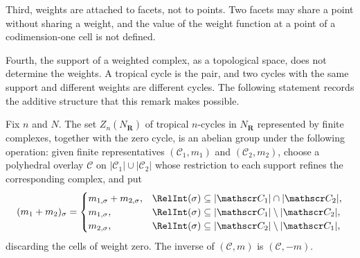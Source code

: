 Third, weights are attached to facets, not to points.  Two facets may share a
point without sharing a weight, and the value of the weight function at a
point of a codimension-one cell is not defined.

Fourth, the support of a weighted complex, as a topological space, does not
determine the weights.  A tropical cycle is the pair, and two cycles with the
same support and different weights are different cycles.  The following
statement records the additive structure that this remark makes possible.

\begin{proposition}
\label{prop:ch10-cycle-group}
Fix $n$ and $N$.  The set $Z_n(N_{\mathbf R})$ of tropical $n$-cycles in
$N_{\mathbf R}$ represented by finite complexes, together with the zero
cycle, is an abelian group under the
following operation: given finite representatives $(\mathscr C_1,m_1)$ and
$(\mathscr C_2,m_2)$, choose a polyhedral overlay $\mathscr C$ on
$|\mathscr C_1|\cup|\mathscr C_2|$ whose restriction to each support
refines the corresponding complex, and put
\[
 (m_1+m_2)_\sigma
 =\begin{cases}
   m_{1,\sigma}+m_{2,\sigma},&\RelInt(\sigma)\subseteq|\mathscr C_1|\cap|\mathscr C_2|,\\
   m_{1,\sigma},&\RelInt(\sigma)\subseteq|\mathscr C_1|\setminus|\mathscr C_2|,\\
   m_{2,\sigma},&\RelInt(\sigma)\subseteq|\mathscr C_2|\setminus|\mathscr C_1|,
  \end{cases}
\]
discarding the cells of weight zero.  The inverse of $(\mathscr C,m)$ is
$(\mathscr C,-m)$.
\end{proposition}

